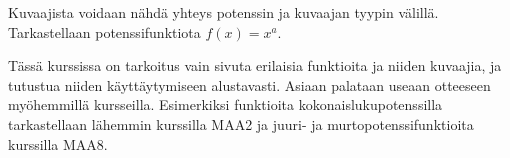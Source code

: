 Kuvaajista voidaan nähdä yhteys potenssin ja kuvaajan tyypin välillä. Tarkastellaan potenssifunktiota $f(x)=x^a$.


%	


Tässä kurssissa on tarkoitus vain sivuta erilaisia funktioita ja niiden kuvaajia, ja tutustua niiden käyttäytymiseen alustavasti. 
Asiaan palataan useaan otteeseen myöhemmillä kursseilla. Esimerkiksi funktioita kokonaislukupotenssilla tarkastellaan lähemmin kurssilla MAA2 ja juuri- ja murtopotenssifunktioita kurssilla MAA8.



